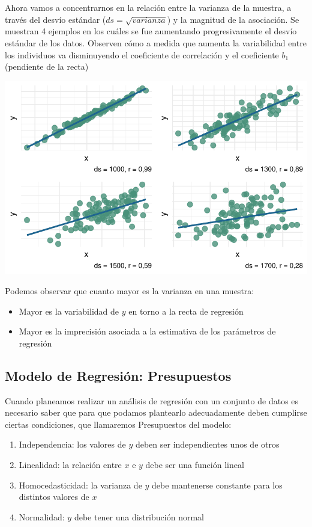 \documentclass[
  letterpaper,
  DIV=11,
  numbers=noendperiod]{scrartcl}
\providecommand{\tightlist}{%
  \setlength{\itemsep}{0pt}\setlength{\parskip}{0pt}}\usepackage{longtable,booktabs,array}
\begin{document}
Ahora vamos a concentrarnos en la relación entre la varianza de la
muestra, a través del desvío estándar (\(ds = \sqrt{varianza}\)) y la
magnitud de la asociación. Se muestran 4 ejemplos en los cuáles se fue
aumentando progresivamente el desvío estándar de los datos. Observen
cómo a medida que aumenta la variabilidad entre los individuos va
disminuyendo el coeficiente de correlación y el coeficiente \(b_1\)
(pendiente de la recta)

\begin{center}
\includegraphics{index_files/figure-pdf/unnamed-chunk-6-1.pdf}
\end{center}

Podemos observar que cuanto mayor es la varianza en una muestra:

\begin{itemize}
\item
  Mayor es la variabilidad de \(y\) en torno a la recta de regresión
\item
  Mayor es la imprecisión asociada a la estimativa de los parámetros de
  regresión
\end{itemize}

\subsection{Modelo de Regresión:
Presupuestos}\label{modelo-de-regresiuxf3n-presupuestos}

Cuando planeamos realizar un análisis de regresión con un conjunto de
datos es necesario saber que para que podamos plantearlo adecuadamente
deben cumplirse ciertas condiciones, que llamaremos Presupuestos del
modelo:

\begin{enumerate}
\def\labelenumi{\arabic{enumi}.}
\tightlist
\item
  Independencia: los valores de \(y\) deben ser independientes unos de
  otros
\item
  Linealidad: la relación entre \(x\) e \(y\) debe ser una función
  lineal
\item
  Homocedasticidad: la varianza de \(y\) debe mantenerse constante para
  los distintos valores de \(x\)
\item
  Normalidad: \(y\) debe tener una distribución normal
\end{enumerate}
\end{document}
